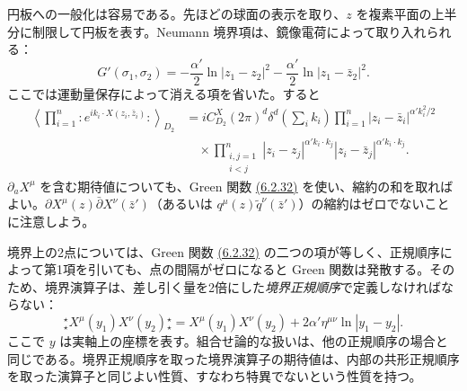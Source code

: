 円板への一般化は容易である。先ほどの球面の表示を取り、$z$ を複素平面の上半分に制限して円板を表す。Neumann 境界項は、鏡像電荷によって取り入れられる：
\begin{equation}
G'(\sigma_1,\sigma_2)=-\frac{\alpha'}2\ln|z_1-z_2|^2
-\frac{\alpha'}2\ln|z_1-\bar z_2|^2.
\tag{6.2.32}\label{eq:6.2.32}
\end{equation}
ここでは運動量保存によって消える項を省いた。すると
\begin{equation}
\begin{aligned}
\left\langle\prod_{i=1}^n:e^{ik_i\cdot X(z_i,\bar z_i)}:\right\rangle_{D_2}
&=iC_{D_2}^X(2\pi)^d\delta^d\!\left(\sum_i k_i\right)
\prod_{i=1}^n|z_i-\bar z_i|^{\alpha'k_i^2/2}\\
&\quad\times\prod_{\substack{i,j=1\\i<j}}^n
|z_i-z_j|^{\alpha'k_i\cdot k_j}|z_i-\bar z_j|^{\alpha'k_i\cdot k_j}.
\end{aligned}
\tag{6.2.33}\label{eq:6.2.33}
\end{equation}
$\partial_aX^\mu$ を含む期待値についても、Green 関数 \hyperref[eq:6.2.32]{(6.2.32)} を使い、縮約の和を取ればよい。$\partial X^\mu(z)\bar\partial X^\nu(\bar z')$（あるいは $q^\mu(z)\widetilde q^\nu(\bar z')$）の縮約はゼロでないことに注意しよう。

境界上の2点については、Green 関数 \hyperref[eq:6.2.32]{(6.2.32)} の二つの項が等しく、正規順序によって第1項を引いても、点の間隔がゼロになると Green 関数は発散する。そのため、境界演算子は、差し引く量を2倍にした\emph{境界正規順序}で定義しなければならない：
\providecommand{\bndnorm}[1]{\mathopen{{}^{\star}_{\star}}#1\mathclose{{}^{\star}_{\star}}}
\begin{equation}
\bndnorm{X^\mu(y_1)X^\nu(y_2)}=X^\mu(y_1)X^\nu(y_2)
+2\alpha'\eta^{\mu\nu}\ln|y_1-y_2|.
\tag{6.2.34}\label{eq:6.2.34}
\end{equation}
ここで $y$ は実軸上の座標を表す。組合せ論的な扱いは、他の正規順序の場合と同じである。境界正規順序を取った境界演算子の期待値は、内部の共形正規順序を取った演算子と同じよい性質、すなわち特異でないという性質を持つ。

